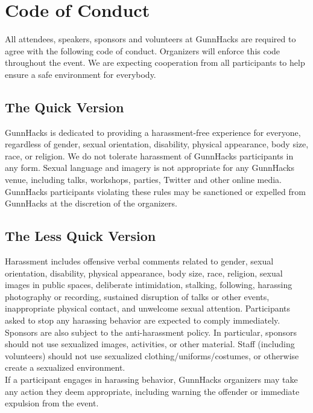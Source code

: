 \documentclass[12pt,onesided,letterpaper]{article}
\begin{document}
\section*{Code of Conduct}

All attendees, speakers, sponsors and volunteers at GunnHacks are required to agree with the following code of conduct. Organizers will enforce this code throughout the event. We are expecting cooperation from all participants to help ensure a safe environment for everybody.

\subsection*{The Quick Version}

GunnHacks is dedicated to providing a harassment-free experience for everyone, regardless of gender, sexual orientation, disability, physical appearance, body size, race, or religion. We do not tolerate harassment of GunnHacks participants in any form. Sexual language and imagery is not appropriate for any GunnHacks venue, including talks, workshops, parties, Twitter and other online media. GunnHacks participants violating these rules may be sanctioned or expelled from GunnHacks at the discretion of the organizers.

\subsection*{The Less Quick Version}

Harassment includes offensive verbal comments related to gender, sexual orientation, disability, physical appearance, body size, race, religion, sexual images in public spaces, deliberate intimidation, stalking, following, harassing photography or recording, sustained disruption of talks or other events, inappropriate physical contact, and unwelcome sexual attention.  Participants asked to stop any harassing behavior are expected to comply immediately.\\

Sponsors are also subject to the anti-harassment policy. In particular, sponsors should not use sexualized images, activities, or other material. Staff (including volunteers) should not use sexualized clothing/uniforms/costumes, or otherwise create a sexualized environment.\\

If a participant engages in harassing behavior, GunnHacks organizers may take any action they deem appropriate, including warning the offender or immediate expulsion from the event.\\
\end{document}
